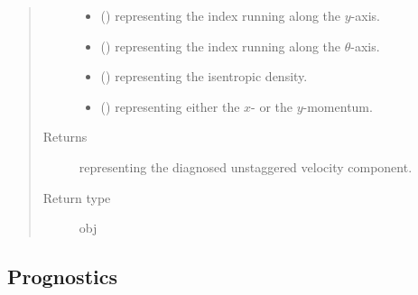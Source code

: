 \documentclass[letterpaper,10pt,english]{sphinxmanual}
\begin{document}
\begin{fulllineitems}
\begin{fulllineitems}
\begin{quote}
\begin{description}
\begin{itemize}
\item {} 
 () \textendash{}  representing the index running along the \(y\)-axis.

\item {} 
 () \textendash{}  representing the index running along the \(\theta\)-axis.

\item {} 
 () \textendash{}  representing the isentropic density.

\item {} 
 () \textendash{}  representing either the \(x\)- or the \(y\)-momentum.

\end{itemize}

\item[{Returns}] \leavevmode
{} representing the diagnosed unstaggered velocity component.

\item[{Return type}] \leavevmode
obj

\end{description}\end{quote}

\end{fulllineitems}


\end{fulllineitems}



\subsection{Prognostics}
\label{\detokenize{api:prognostics}}
\end{document}
